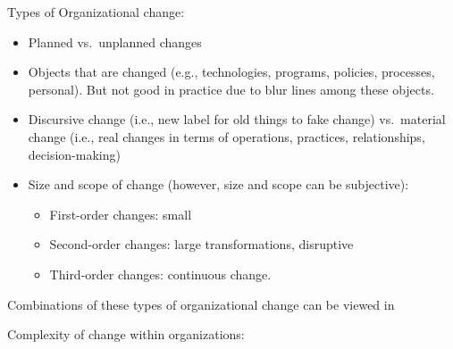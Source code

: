\documentclass[
]{book}
\begin{document}
Types of Organizational change:

\begin{itemize}
\item
  Planned vs.~unplanned changes
\item
  Objects that are changed (e.g., technologies, programs, policies, processes, personal). But not good in practice due
  to blur lines among these objects.
\item
  Discursive change (i.e., new label for old things to fake change) vs.~material change (i.e., real changes in terms
  of operations, practices, relationships, decision-making) \citep[pp.10]{Zorn_1999}
\item
  Size and scope of change \citep{Bartunek_1987} (however, size and scope can be subjective):

  \begin{itemize}
  \item
    First-order changes: small
  \item
    Second-order changes: large transformations, disruptive
  \item
    Third-order changes: continuous change.
  \end{itemize}
\end{itemize}

Combinations of these types of organizational change can be viewed in \citep[pp.~42]{Lewis_2019}

Complexity of change within organizations:
\end{document}
